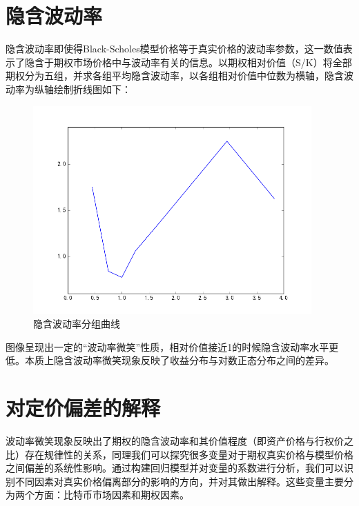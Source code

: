 \section{隐含波动率}
隐含波动率即使得Black-Scholes模型价格等于真实价格的波动率参数，这一数值表示了隐含于期权市场价格中与波动率有关的信息。以期权相对价值（S/K）将全部期权分为五组，并求各组平均隐含波动率，以各组相对价值中位数为横轴，隐含波动率为纵轴绘制折线图如下：
\begin{figure}[H]
    \begin{small}
        \begin{center}
            \includegraphics[width=0.95\textwidth]{figures/mean_isd.png}
        \end{center}
        \caption{隐含波动率分组曲线}
        \label{fig:mean_isd}
    \end{small}
\end{figure}
图像呈现出一定的“波动率微笑”性质，相对价值接近1的时候隐含波动率水平更低。本质上隐含波动率微笑现象反映了收益分布与对数正态分布之间的差异。

    \section{对定价偏差的解释}\label{reg vars}
    波动率微笑现象反映出了期权的隐含波动率和其价值程度（即资产价格与行权价之比）存在规律性的关系，同理我们可以探究很多变量对于期权真实价格与模型价格之间偏差的系统性影响。通过构建回归模型并对变量的系数进行分析，我们可以识别不同因素对真实价格偏离部分的影响的方向，并对其做出解释。这些变量主要分为两个方面：比特币市场因素和期权因素。
